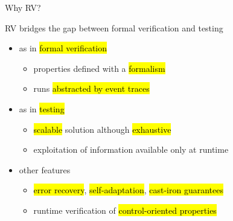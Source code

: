 \documentclass[10pt,usenames,dvipsnames]{beamer}
\begin{document}

\begin{frame}{Why RV?}
  \begin{block}{RV bridges the gap between formal verification and testing}
    \begin{itemize}
    \item as in \hl{formal verification}
      \begin{itemize}
      \item properties defined with a \hl{formalism}
      \item runs \hl{abstracted by event traces}
      \end{itemize}
    \item as in \hl{testing}
      \begin{itemize}
      \item \hl{scalable} solution although  \hl{exhaustive}
      \item exploitation of information available only at runtime
      \end{itemize}
    \item other features
      \begin{itemize}
      \item \hl{error recovery}, \hl{self-adaptation}, \hl{cast-iron guarantees}
      \item runtime verification of \hl{control-oriented properties}
      \end{itemize}
    \end{itemize}
  \end{block}
\end{frame}

\end{document}
